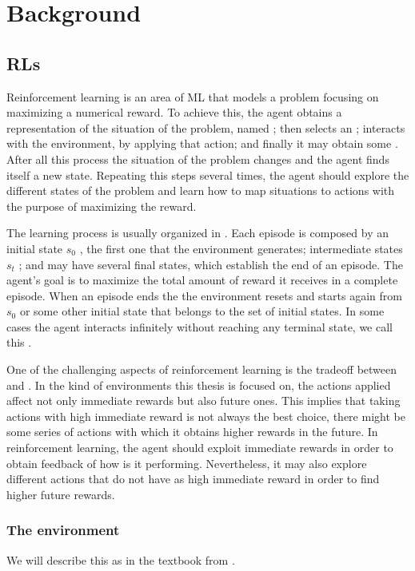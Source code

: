 \chapter{Background}

\section{\aclp{RL}}
Reinforcement learning is an area of \acf{ML} that models a problem focusing on maximizing a numerical reward. To achieve this, the agent obtains a representation of the situation of the problem, named ; then selects an ; interacts with the environment, by applying that action; and finally it may obtain some . After all this process the situation of the problem changes and the agent finds itself a new state. Repeating this steps several times, the agent should explore the different states of the problem and learn how to map situations to actions with the purpose of maximizing the reward.

The learning process is usually organized in . Each episode is composed by an initial state $s_0$ , the first one that the environment generates; intermediate states $s_t$ ; and may have several final states, which establish the end of an episode. The agent's goal is to maximize the total amount of reward it receives in a complete episode. When an episode ends the the environment resets and starts again from $s_0$ or some other initial state that belongs to the set of initial states. In some cases the agent interacts infinitely without reaching any terminal state, we call this .

One of the challenging aspects of reinforcement learning is the tradeoff between  and . In the kind of environments this thesis is focused on, the actions applied affect not only immediate rewards but also future ones. This implies that taking actions with high immediate reward is not always the best choice, there might be some series of actions with which it obtains higher rewards in the future. In reinforcement learning, the agent should exploit immediate rewards in order to obtain feedback of how is it performing. Nevertheless, it may also explore different actions that do not have as high immediate reward in order to find higher future rewards.

\subsection{The environment}
We will describe this as in the textbook  from \citet[Section~3.1]{sutton1998introduction}.

